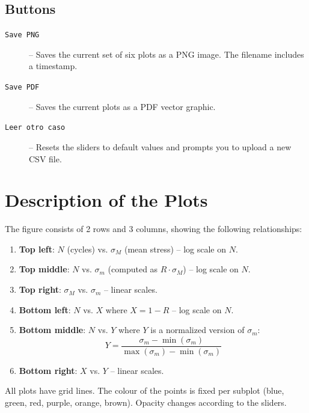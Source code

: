 \documentclass[12pt,a4paper]{article}
\begin{document}
\subsection{Buttons}
\begin{description}
    \item[\texttt{Save PNG}] – Saves the current set of six plots as a PNG image. The filename includes a timestamp.
    \item[\texttt{Save PDF}] – Saves the current plots as a PDF vector graphic.
    \item[\texttt{Leer otro caso}] – Resets the sliders to default values and prompts you to upload a new CSV file.
\end{description}

\section{Description of the Plots}
\label{sec:plots}
The figure consists of 2 rows and 3 columns, showing the following relationships:

\begin{enumerate}
    \item \textbf{Top left}: $N$ (cycles) vs. $\sigma_M$ (mean stress) – log scale on $N$.
    \item \textbf{Top middle}: $N$ vs. $\sigma_m$ (computed as $R \cdot \sigma_M$) – log scale on $N$.
    \item \textbf{Top right}: $\sigma_M$ vs. $\sigma_m$ – linear scales.
    \item \textbf{Bottom left}: $N$ vs. $X$ where $X = 1 - R$ – log scale on $N$.
    \item \textbf{Bottom middle}: $N$ vs. $Y$ where $Y$ is a normalized version of $\sigma_m$:
        \[
        Y = \frac{\sigma_m - \min(\sigma_m)}{\max(\sigma_m) - \min(\sigma_m)}
        \]
    \item \textbf{Bottom right}: $X$ vs. $Y$ – linear scales.
\end{enumerate}

All plots have grid lines. The colour of the points is fixed per subplot (blue, green, red, purple, orange, brown). Opacity changes according to the sliders.
\end{document}
